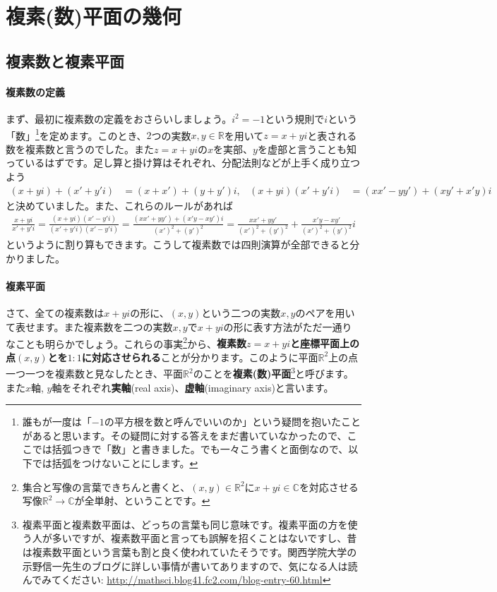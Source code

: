 \section{複素(数)平面の幾何}

\subsection{複素数と複素平面}

\paragraph{複素数の定義}

まず、最初に複素数の定義をおさらいしましょう。$i^2=-1$という規則で$i$という「数」\footnote{誰もが一度は「$-1$の平方根を数と呼んでいいのか」という疑問を抱いたことがあると思います。その疑問に対する答えをまだ書いていなかったので、ここでは括弧つきで「数」と書きました。でも一々こう書くと面倒なので、以下では括弧をつけないことにします。}を定めます。このとき、$2$つの実数$x,y\in\mathbb{R}$を用いて$z=x+yi$と表される数を複素数と言うのでした。また$z=x+yi$の$x$を実部、$y$を虚部と言うことも知っているはずです。足し算と掛け算はそれぞれ、分配法則などが上手く成り立つよう
\begin{align*}
(x+yi) + (x'+y'i) &= (x+x')+(y+y')i, &  (x+yi)(x'+y'i) &= (xx' - yy') + (xy'+x'y)i
\end{align*}
と決めていました。また、これらのルールがあれば
\begin{align*}
\frac{x+yi}{x'+y'i}
= \frac{(x+yi)(x'-y'i)}{(x'+y'i)(x'-y'i)} = \frac{(xx'+yy')+(x'y-xy')i}{(x')^2+(y')^2}
= \frac{xx'+yy'}{(x')^2+(y')^2} + \frac{x'y-xy'}{(x')^2+(y')^2}i
\end{align*}
というように割り算もできます。こうして複素数では四則演算が全部できると分かりました。

\paragraph{複素平面}

さて、全ての複素数は$x+yi$の形に、$(x,y)$という二つの実数$x,y$のペアを用いて表せます。また複素数を二つの実数$x,y$で$x+yi$の形に表す方法がただ一通りなことも明らかでしょう。これらの事実\footnote{集合と写像の言葉できちんと書くと、$(x,y)\in\mathbb{R}^2$に$x+yi\in\mathbb{C}$を対応させる写像$\mathbb{R}^2\rightarrow\mathbb{C}$が全単射、ということです。}から、\textbf{複素数$z=x+yi$と座標平面上の点$(x,y)$とを$1:1$に対応させられる}ことが分かります。このように平面$\mathbb{R}^2$上の点一つ一つを複素数と見なしたとき、平面$\mathbb{R}^2$のことを\textbf{複素(数)平面}\footnote{複素平面と複素数平面は、どっちの言葉も同じ意味です。複素平面の方を使う人が多いですが、複素数平面と言っても誤解を招くことはないですし、昔は複素数平面という言葉も割と良く使われていたそうです。関西学院大学の示野信一先生のブログに詳しい事情が書いてありますので、気になる人は読んでみてください: \url{http://mathsci.blog41.fc2.com/blog-entry-60.html}}と呼びます。また$x$軸, $y$軸をそれぞれ\textbf{実軸}(real axis)、\textbf{虚軸}(imaginary axis)と言います。

